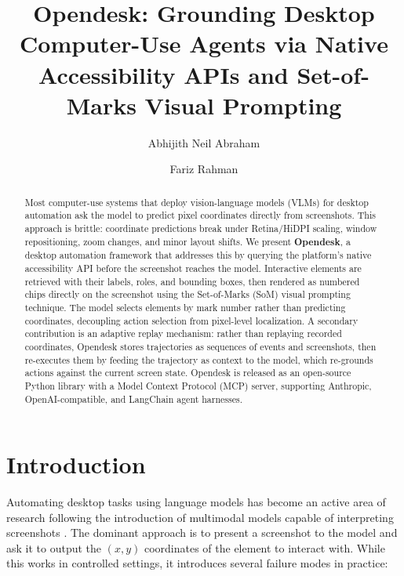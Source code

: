 \documentclass[11pt]{article}
\title{\textbf{Opendesk: Grounding Desktop Computer-Use Agents via Native Accessibility APIs and Set-of-Marks Visual Prompting}}
\author[1]{Abhijith Neil Abraham}
\author[1]{Fariz Rahman}
\affil[1]{Vitalops, \texttt{\{abhijith, fariz\}@vitalops.ai}}
\date{}
\begin{document}
\maketitle

\begin{abstract}
Most computer-use systems that deploy vision-language models (VLMs) for desktop automation ask the model to predict pixel coordinates directly from screenshots. This approach is brittle: coordinate predictions break under Retina/HiDPI scaling, window repositioning, zoom changes, and minor layout shifts. We present \textbf{Opendesk}, a desktop automation framework that addresses this by querying the platform's native accessibility API before the screenshot reaches the model. Interactive elements are retrieved with their labels, roles, and bounding boxes, then rendered as numbered chips directly on the screenshot using the Set-of-Marks (SoM) visual prompting technique. The model selects elements by mark number rather than predicting coordinates, decoupling action selection from pixel-level localization. A secondary contribution is an adaptive replay mechanism: rather than replaying recorded coordinates, Opendesk stores trajectories as sequences of events and screenshots, then re-executes them by feeding the trajectory as context to the model, which re-grounds actions against the current screen state. Opendesk is released as an open-source Python library with a Model Context Protocol (MCP) server, supporting Anthropic, OpenAI-compatible, and LangChain agent harnesses.
\end{abstract}

\section{Introduction}

Automating desktop tasks using language models has become an active area of research following the introduction of multimodal models capable of interpreting screenshots \cite{yang2023som, agentS, openai2023gpt4v}. The dominant approach is to present a screenshot to the model and ask it to output the $(x, y)$ coordinates of the element to interact with. While this works in controlled settings, it introduces several failure modes in practice:
\end{document}
